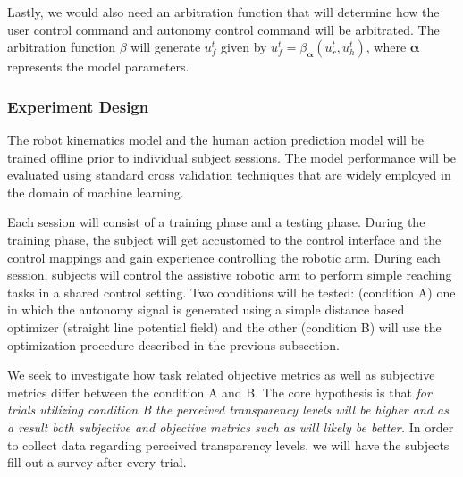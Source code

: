 \documentclass[12pt]{article}
\begin{document}
Lastly, we would also need an arbitration function that will determine how the user control command and autonomy control command will be arbitrated. The arbitration function $\beta$ will generate $u_f^t$ given by $u_f^t = \beta_{\boldsymbol{\alpha}}(u_r^t, u_h^t)$, where $\boldsymbol{\alpha}$ represents the model parameters. 
%
%
%

\subsubsection{Experiment Design}

The robot kinematics model and the human action prediction model will be trained offline prior to individual subject sessions. The model performance will be evaluated using standard cross validation techniques that are widely employed in the domain of machine learning. 

Each session will consist of a training phase and a testing phase. During the training phase, the subject will get accustomed to the control interface and the control mappings and gain experience controlling the robotic arm. 
During each session, subjects will control the assistive robotic arm to perform simple reaching tasks in a shared control setting. Two conditions will be tested: (condition A) one in which the autonomy signal is generated using a simple distance based optimizer (straight line potential field) and the other (condition B) will use the optimization procedure described in the previous subsection. 

We seek to investigate how task related objective metrics as well as subjective metrics differ between the condition A and B. The core hypothesis is that \textit{for trials utilizing condition B the perceived transparency levels will be higher and as a result both subjective and objective metrics such as will likely be better. } In order to collect data regarding perceived transparency levels, we will have the subjects fill out a survey after every trial. 
\end{document}

